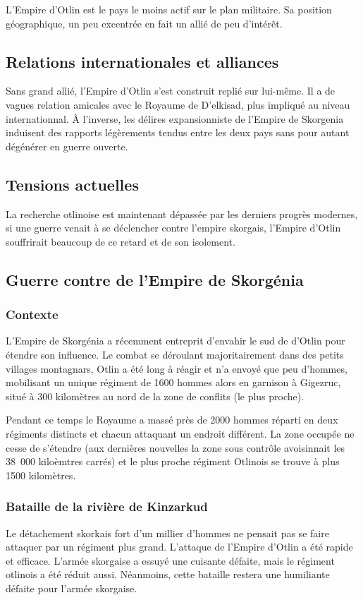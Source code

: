 \documentclass[french, a4paper, 12pt]{article}
\begin{document}
L'Empire d'Otlin est le pays le moins actif sur le plan militaire. Sa position géographique, un peu excentrée en fait un allié de peu d'intérêt.

\subsection{Relations internationales et alliances}

Sans grand allié, l'Empire d'Otlin s'est construit replié sur lui-même. Il a de vagues relation amicales avec le Royaume de D'elkisad, plus impliqué au niveau internationnal. À l'inverse, les délires expansionniste de l'Empire de Skorgenia induisent des rapports légèrements tendus entre les deux pays sans pour autant dégénérer en guerre ouverte.

\subsection{Tensions actuelles}

La recherche otlinoise est maintenant dépassée par les derniers progrès modernes, si une guerre venait à se déclencher contre l'empire skorgais, l'Empire d'Otlin souffrirait beaucoup de ce retard et de son isolement.

\subsection{Guerre contre de l'Empire de Skorgénia}

\subsubsection{Contexte}
L'Empire de Skorgénia a récemment entreprit d'envahir le sud de d'Otlin pour étendre son influence. Le combat se déroulant majoritairement dans des petits villages montagnars, Otlin a été long à réagir et n'a envoyé que peu d'hommes, mobilisant un unique régiment de 1600 hommes alors en garnison à Gigezruc, situé à 300 kilomètres au nord de la zone de conflits (le plus proche).

Pendant ce temps le Royaume a massé près de 2000 hommes réparti en deux régiments distincts et chacun attaquant un endroit différent. La zone occupée ne cesse de s'étendre (aux dernières nouvelles la zone sous contrôle avoisinnait les 38~000 kiloèmtres carrés) et le plus proche régiment Otlinois se trouve à plus 1500 kilomètres.

\subsubsection{Bataille de la rivière de Kinzarkud}
Le détachement skorkais fort d'un millier d'hommes ne pensait pas se faire attaquer par un régiment plus grand. L'attaque de l'Empire d'Otlin a été rapide et efficace. L'armée skorgaise a essuyé une cuisante défaite, mais le régiment otlinois a été réduit aussi. Néanmoins, cette bataille restera une humiliante défaite pour l'armée skorgaise.
\end{document}
